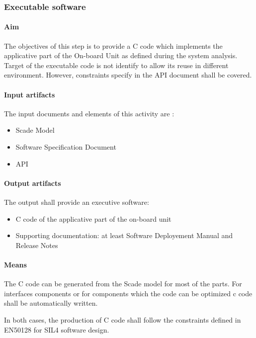 \subsubsection{Executable software}


\paragraph{Aim}
The objectives of this step is to provide a C code which implements the applicative part of the On-board Unit as defined during the system analysis. Target of the executable code is not identify to  allow its reuse in different environment.
However, constraints specify in the API document shall be covered.


\paragraph{Input artifacts}

The input documents and elements of this activity are :
\begin{itemize}
\item Scade Model
\item Software Specification Document
\item API
\end{itemize}

\paragraph{Output artifacts}

The output shall provide an executive software:

\begin{itemize}
\item C code of the applicative part of the on-board unit
\item Supporting documentation: at least Software Deployement Manual and Release Notes

\end{itemize}

\paragraph{Means}

The C code can be generated from the Scade model for most of the parts. For interfaces components or for components which the code can be optimized c code shall be automatically written.

In both cases, the production of C code shall follow the constraints defined in EN50128 for SIL4 software design.



